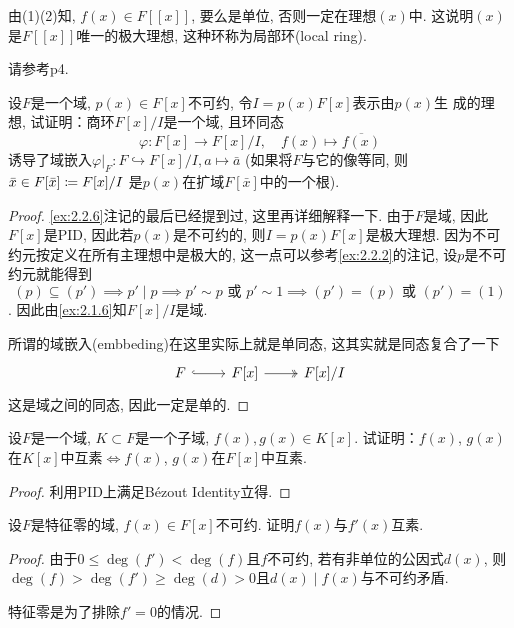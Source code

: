 \begin{remark}
    由(1)(2)知, $f(x) \in F[[x]]$, 要么是单位, 否则一定在理想$(x)$中. 这说明$(x)$是$F[[x]]$唯一的极大理想, 这种环称为局部环(local ring).
    
    请参考\cite{atiyah1994introduction}p4.
\end{remark}

\begin{problem}
    设$F$是一个域, $p(x) \in F[x]$不可约, 令$I = p(x)F[x]$表示由$p(x)$生
成的理想, 试证明：商环$F[x]/I$是一个域, 且环同态
\[
    \varphi:F[x] \to F[x]/I,\quad f(x) \mapsto \overline{f(x)}
\]
诱导了域嵌入$\varphi|_F: F\hookrightarrow F[x]/I, a \mapsto \bar{a}$
(如果将$F$与它的像等同, 则$\bar{x} \in F[\bar{x}] \mathrel{\coloneqq} F[x]/I$
是$p(x)$在扩域$F[\bar{x}]$中的一个根).
\end{problem}

\begin{proof}
    \ref{ex:2.2.6}注记的最后已经提到过, 这里再详细解释一下. 由于$F$是域, 因此$F[x]$是PID, 因此若$p(x)$是不可约的, 则$I = p(x)F[x]$是极大理想. 因为不可约元按定义在所有主理想中是极大的, 这一点可以参考\ref{ex:2.2.2}的注记, 设$p$是不可约元就能得到
    \[
        (p) \subseteq (p') \implies p' \mid p \implies p' \sim p \text{ 或 } p' \sim 1 \implies (p') = (p) \text{ 或 } (p') = (1)
    \]. 因此由\ref{ex:2.1.6}知$F[x]/I$是域.
    
    所谓的域嵌入(embbeding)在这里实际上就是单同态, 这其实就是同态复合了一下
    \[
        \begin{tikzcd}
            F \arrow[r, hook] & {F[x]} \arrow[r, two heads] & {F[x]/I}
        \end{tikzcd}
    \]
    这是域之间的同态, 因此一定是单的.
\end{proof}

\begin{problem}
    设$F$是一个域, $K \subset F$是一个子域, $f(x), g(x) \in K[x]$.
试证明：$f(x)$, $g(x)$在$K[x]$中互素$\Leftrightarrow f(x)$,
$g(x)$在$F[x]$中互素.
\end{problem}

\begin{proof}
    利用PID上满足Bézout Identity立得.
\end{proof}

\begin{problem}
    设$F$是特征零的域, $f(x) \in F[x]$不可约. 证明$f(x)$与$f'(x)$互素.
\end{problem}

\begin{proof}
    由于$0 \leqslant \deg(f') < \deg(f)$且$f$不可约, 若有非单位的公因式$d(x)$, 则$\deg(f) > \deg(f') \geqslant \deg(d) > 0$且$d(x) \mid f(x)$与不可约矛盾.

    特征零是为了排除$f' = 0$的情况.
\end{proof}

